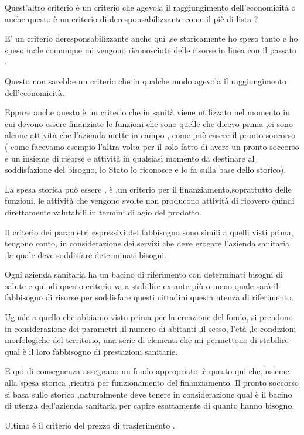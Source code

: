 \documentclass[]{article}
\begin{document}
Quest'altro criterio è un criterio che agevola il raggiungimento
dell'economicità o anche questo è un criterio di deresponsabilizzante
come il piè di lista ?

E' un criterio deresponsabilizzante anche qui ,se storicamente ho speso
tanto e ho speso male comunque mi vengono riconosciute delle risorse in
linea con il passato .

Questo non sarebbe un criterio che in qualche modo agevola il
raggiungimento dell'economicità.

Eppure anche questo è un criterio che in sanità viene utilizzato nel
momento in cui devono essere finanziate le funzioni che sono quelle che
dicevo prima ,ci sono alcune attività che l'azienda mette in campo ,
come può essere il pronto soccorso ( come facevamo esempio l'altra volta
per il solo fatto di avere un pronto soccorso e un insieme di risorse e
attività in qualsiasi momento da destinare al soddisfazione del bisogno,
lo Stato lo riconosce e lo fa sulla base dello storico).

La spesa storica può essere , è ,un criterio per il
finanziamento,soprattutto delle funzioni, le attività che vengono svolte
non producono attività di ricovero quindi direttamente valutabili in
termini di agio del prodotto.

Il criterio dei parametri espressivi del fabbisogno sono simili a quelli
visti prima, tengono conto, in considerazione dei servizi che deve
erogare l'azienda sanitaria ,la quale deve soddisfare determinati
bisogni.

Ogni azienda sanitaria ha un bacino di riferimento con determinati
bisogni di salute e quindi questo criterio va a stabilire ex ante più o
meno quale sarà il fabbisogno di risorse per soddisfare questi cittadini
questa utenza di riferimento.

Uguale a quello che abbiamo visto prima per la creazione del fondo, si
prendono in considerazione dei parametri ,il numero di abitanti ,il
sesso, l'età ,le condizioni morfologiche del territorio, una serie di
elementi che mi permettono di stabilire qual è il loro fabbisogno di
prestazioni sanitarie.

E qui di conseguenza assegnano un fondo appropriato: è questo qui
che,insieme alla spesa storica ,rientra per funzionamento del
finanziamento. Il pronto soccorso si basa sullo storico ,naturalmente
deve tenere in considerazione qual è il bacino di utenza dell'azienda
sanitaria per capire esattamente di quanto hanno bisogno.

Ultimo è il criterio del prezzo di trasferimento .
\end{document}
